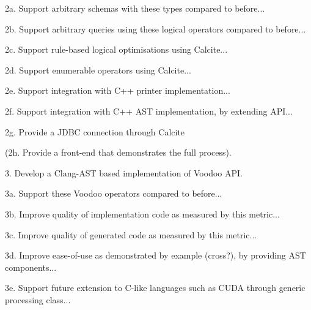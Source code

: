 2a. Support arbitrary schemas with these types compared to before...

2b. Support arbitrary queries using these logical operators compared to before...

2c. Support rule-based logical optimisations using Calcite...

2d. Support enumerable operators using Calcite...

2e. Support integration with C++ printer implementation...

2f. Support integration with C++ AST implementation, by extending API...

2g. Provide a JDBC connection through Calcite

(2h. Provide a front-end that demonstrates the full process).

3. Develop a Clang-AST based implementation of Voodoo API.

3a. Support these Voodoo operators compared to before...

3b. Improve quality of implementation code as measured by this metric...

3c. Improve quality of generated code as measured by this metric...

3d. Improve ease-of-use as demonstrated by example (cross?), by providing AST components...

3e. Support future extension to C-like languages such as CUDA through generic processing class...
